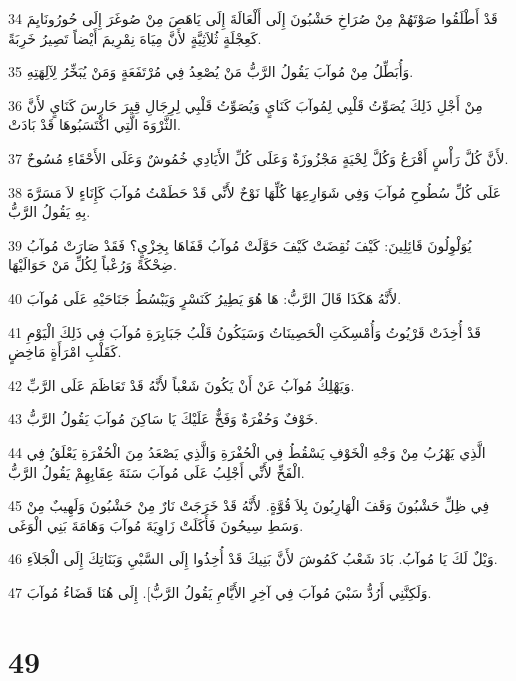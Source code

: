 \par 34 قَدْ أَطْلَقُوا صَوْتَهُمْ مِنْ صُرَاخِ حَشْبُونَ إِلَى أَلْعَالَةَ إِلَى يَاهَصَ مِنْ صُوغَرَ إِلَى حُورُونَايِمَ كَعِجْلَةٍ ثُلاَثِيَّةٍ لأَنَّ مِيَاهَ نِمْرِيمَ أَيْضاً تَصِيرُ خَرِبَةً.
\par 35 وَأُبَطِّلُ مِنْ مُوآبَ يَقُولُ الرَّبُّ مَنْ يُصْعِدُ فِي مُرْتَفَعَةٍ وَمَنْ يُبَخِّرُ لِآلِهَتِهِ.
\par 36 مِنْ أَجْلِ ذَلِكَ يُصَوِّتُ قَلْبِي لِمُوآبَ كَنَايٍ وَيُصَوِّتُ قَلْبِي لِرِجَالِ قِيرَ حَارِسَ كَنَايٍ لأَنَّ الثَّرْوَةَ الَّتِي اكْتَسَبُوهَا قَدْ بَادَتْ.
\par 37 لأَنَّ كُلَّ رَأْسٍ أَقْرَعُ وَكُلَّ لِحْيَةٍ مَجْزُوزَةٌ وَعَلَى كُلِّ الأَيَادِي خُمُوشٌ وَعَلَى الأَحْقَاءِ مُسُوحٌ.
\par 38 عَلَى كُلِّ سُطُوحِ مُوآبَ وَفِي شَوَارِعِهَا كُلِّهَا نَوْحٌ لأَنِّي قَدْ حَطَمْتُ مُوآبَ كَإِنَاءٍ لاَ مَسَرَّةَ بِهِ يَقُولُ الرَّبُّ.
\par 39 يُوَلْوِلُونَ قَائِلِينَ: كَيْفَ نُقِضَتْ كَيْفَ حَوَّلَتْ مُوآبُ قَفَاهَا بِخِزْيٍ؟ فَقَدْ صَارَتْ مُوآبُ ضِحْكَةً وَرُعْباً لِكُلِّ مَنْ حَوَالَيْهَا.
\par 40 لأَنَّهُ هَكَذَا قَالَ الرَّبُّ: هَا هُوَ يَطِيرُ كَنَسْرٍ وَيَبْسُطُ جَنَاحَيْهِ عَلَى مُوآبَ.
\par 41 قَدْ أُخِذَتْ قَرْيُوتُ وَأُمْسِكَتِ الْحَصِينَاتُ وَسَيَكُونُ قَلْبُ جَبَابِرَةِ مُوآبَ فِي ذَلِكَ الْيَوْمِ كَقَلْبِ امْرَأَةٍ مَاخِضٍ.
\par 42 وَيَهْلِكُ مُوآبُ عَنْ أَنْ يَكُونَ شَعْباً لأَنَّهُ قَدْ تَعَاظَمَ عَلَى الرَّبِّ.
\par 43 خَوْفٌ وَحُفْرَةٌ وَفَخٌّ عَلَيْكَ يَا سَاكِنَ مُوآبَ يَقُولُ الرَّبُّ.
\par 44 الَّذِي يَهْرُبُ مِنْ وَجْهِ الْخَوْفِ يَسْقُطُ فِي الْحُفْرَةِ وَالَّذِي يَصْعَدُ مِنَ الْحُفْرَةِ يَعْلَقُ فِي الْفَخِّ لأَنِّي أَجْلِبُ عَلَى مُوآبَ سَنَةَ عِقَابِهِمْ يَقُولُ الرَّبُّ.
\par 45 فِي ظِلِّ حَشْبُونَ وَقَفَ الْهَارِبُونَ بِلاَ قُوَّةٍ. لأَنَّهُ قَدْ خَرَجَتْ نَارٌ مِنْ حَشْبُونَ وَلَهِيبٌ مِنْ وَسَطِ سِيحُونَ فَأَكَلَتْ زَاوِيَةَ مُوآبَ وَهَامَةَ بَنِي الْوَغَى.
\par 46 وَيْلٌ لَكَ يَا مُوآبُ. بَادَ شَعْبُ كَمُوشَ لأَنَّ بَنِيكَ قَدْ أُخِذُوا إِلَى السَّبْيِ وَبَنَاتِكَ إِلَى الْجَلاَءِ.
\par 47 وَلَكِنَّنِي أَرُدُّ سَبْيَ مُوآبَ فِي آخِرِ الأَيَّامِ يَقُولُ الرَّبُّ]. إِلَى هُنَا قَضَاءُ مُوآبَ.

\chapter{49}

